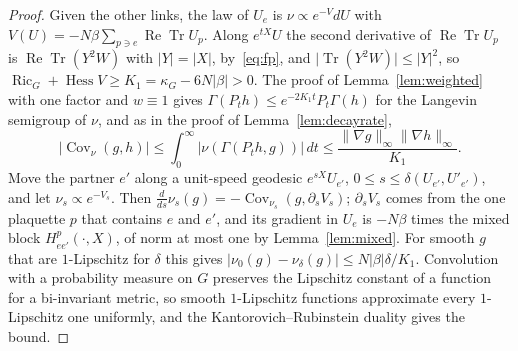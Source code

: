 \documentclass[aps,prd,twocolumn,superscriptaddress,nofootinbib,longbibliography,floatfix,amsmath,amssymb,10pt]{revtex4-2}
\theoremstyle{definition}
\theoremstyle{remark}
\newcommand{\Tr}{\operatorname{Tr}}
\newcommand{\ReTr}{\operatorname{Re}\operatorname{Tr}}
\newcommand{\Hess}{\operatorname{Hess}}
\newcommand{\Ric}{\operatorname{Ric}}
\newcommand{\Cov}{\operatorname{Cov}}
\begin{document}
\begin{proof}
Given the other links, the law of $U_e$ is $\nu\propto e^{-V}dU$ with
$V(U)=-N\beta\sum_{p\ni e}\ReTr U_p$. Along $e^{tX}U$ the second
derivative of $\ReTr U_p$ is $\ReTr(Y^2W)$ with $\lvert Y\rvert=\lvert X
\rvert$, by~\eqref{eq:fp}, and $\lvert\Tr(Y^2W)\rvert\le\lvert Y\rvert^2$,
so $\Ric_G+\Hess V\ge K_1=\kappa_G-6N\lvert\beta\rvert>0$. The proof of
Lemma~\ref{lem:weighted} with one factor and $w\equiv1$ gives
$\Gamma(P_th)\le e^{-2K_1t}P_t\Gamma(h)$ for the Langevin semigroup of
$\nu$, and as in the proof of Lemma~\ref{lem:decayrate},
\[
\lvert\Cov_\nu(g,h)\rvert\le\int_0^\infty\lvert\nu(\Gamma(P_th,g))\rvert
\,dt\le\frac{\lVert\nabla g\rVert_\infty\lVert\nabla h\rVert_\infty}{K_1}.
\]
Move the partner $e'$ along a unit-speed geodesic $e^{sX}U_{e'}$, $0\le s
\le\delta(U_{e'},U'_{e'})$, and let $\nu_s\propto e^{-V_s}$. Then $\frac
d{ds}\nu_s(g)=-\Cov_{\nu_s}(g,\partial_sV_s)$; $\partial_sV_s$ comes from
the one plaquette $p$ that contains $e$ and $e'$, and its gradient in $U_e$
is $-N\beta$ times the mixed block $H^p_{ee'}(\cdot,X)$, of norm at most
one by Lemma~\ref{lem:mixed}. For smooth $g$ that are $1$-Lipschitz for
$\delta$ this gives $\lvert\nu_0(g)-\nu_\delta(g)\rvert\le N\lvert\beta
\rvert\delta/K_1$. Convolution with a probability measure on $G$ preserves
the Lipschitz constant of a function for a bi-invariant metric, so smooth
$1$-Lipschitz functions approximate every $1$-Lipschitz one uniformly, and
the Kantorovich--Rubinstein duality gives the bound.
\end{proof}
\end{document}
